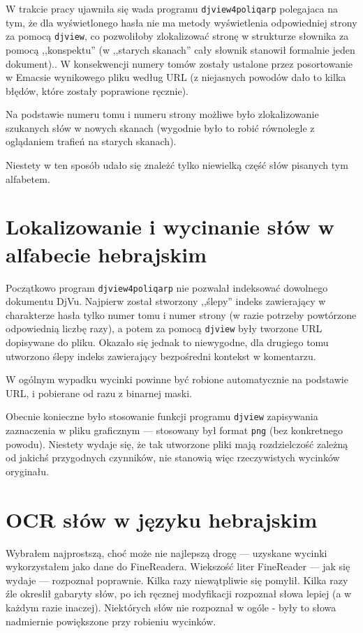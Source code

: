 \documentclass[12]{mwart}
\begin{document}
W trakcie pracy ujawniła się wada programu \texttt{djview4poliqarp}
polegajaca na tym, że dla wyświetlonego hasła nie ma metody
wyświetlenia odpowiedniej strony za pomocą \texttt{djview}, co
pozwoliłoby zlokalizować stronę w strukturze słownika za pomocą
,,konspektu'' (w ,,starych skanach'' cały słownik stanowił formalnie
jeden dokument).. W konsekwencji numery tomów zostały ustalone przez
posortowanie w Emacsie wynikowego pliku według URL (z niejasnych
powodów dało to kilka błędów, które zostały poprawione ręcznie).

Na podstawie numeru tomu i numeru strony możliwe było zlokalizowanie
szukanych słów w nowych skanach (wygodnie było to robić równolegle z
oglądaniem trafień na starych skanach).

Niestety w ten sposób udało się znależć tylko niewielką część słów
pisanych tym alfabetem.

\section{Lokalizowanie i wycinanie słów w alfabecie hebrajskim}
\label{sec:lokal-i-wycin}

Początkowo program \texttt{djview4poliqarp} nie pozwalał indeksować
dowolnego dokumentu DjVu. Najpierw został stworzony ,,ślepy'' indeks
zawierający w charakterze hasła tylko numer tomu i numer strony (w
razie potrzeby powtórzone odpowiednią liczbę razy), a potem za pomocą
\texttt{djview} były tworzone URL dopisywane do pliku. Okazało się
jednak to niewygodne, dla drugiego tomu utworzono ślepy indeks
zawierający bezpośredni kontekst w komentarzu.

W ogólnym wypadku wycinki powinne być robione automatycznie na
podstawie URL, i pobierane od razu z binarnej maski. 

Obecnie konieczne było stosowanie funkcji programu \texttt{djview}
zapisywania zaznaczenia w pliku graficznym --- stosowany był format
\texttt{png} (bez konkretnego powodu). Niestety wydaje się, że tak
utworzone pliki mają rozdzielczość zależną od jakichś przygodnych
czynników, nie stanowią więc rzeczywistych wycinków oryginału.

\section{OCR słów w języku hebrajskim}
\label{sec:ocr-sow-w}

Wybrałem najprostszą, choć może nie najlepszą drogę --- uzyskane
wycinki wykorzystałem jako dane do FineReadera. Wiekszość liter
FineReader --- jak się wydaje --- rozpoznał poprawnie. Kilka razy
niewątpliwie się pomylił. Kilka razy źle okreslił gabaryty słów, po
ich ręcznej modyfikacji rozpoznał słowa lepiej (a w każdym razie
inaczej). Niektórych słów nie rozpoznał w ogóle - były to słowa
nadmiernie powiększone przy robieniu wycinków.
\end{document}
